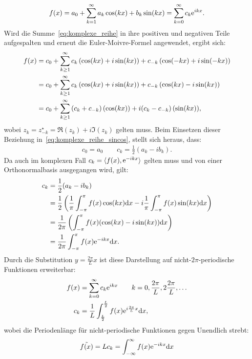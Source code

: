 \begin{align}
\label{eq:komplexe_reihe}
    f(x) = a_0 + \sum_{k=1}^{\infty}{a_k \cos(kx)+b_k \sin(kx)}=\sum_{k=0}^{\infty}{c_k \text{e}^{ikx}}.
\end{align}
Wird die Summe~\eqref{eq:komplexe_reihe} in ihre positiven und negativen Teile aufgespalten und erneut die Euler-Moivre-Formel angewendet, ergibt sich:
\begin{align}
\label{eq:komplexe_reihe_sincos}
    f(x) &= c_0 + \sum_{k\geq 1}^{\infty}{c_k \left( \cos(kx) + i \sin(kx)\right) + c_{-k} \left( \cos(-kx) + i \sin(-kx)\right)} \notag \\
    &= c_0 + \sum_{k\geq 1}^{\infty}{c_k \left( \cos(kx) + i \sin(kx)\right) + c_{-k} \left( \cos(kx) - i \sin(kx)\right)} \notag \\
    &= c_0 + \sum_{k\geq 1}^{\infty}{(c_k + c_{-k}) \left( \cos(kx)\right) + i(c_k - c_{-k})\left( \sin(kx)\right)},
\end{align}
wobei $z_{k}=z_{-k}^\star=\Re(z_k)+i\Im(z_k)$ gelten muss. Beim Einsetzen dieser Beziehung in~\eqref{eq:komplexe_reihe_sincos}, stellt sich heraus, dass:
\begin{align*}
    c_0 = a_0 \qquad c_k = \frac{1}{2}(a_k-ib_k).
\end{align*}
Da auch im komplexen Fall $c_k = \braket{f(x),\text{e}^{-ikx}}$ gelten muss und von einer Orthonormalbasis ausgegangen wird, gilt:
\begin{align}
    c_k &= \frac{1}{2}(a_k - i b_k) \notag \\
    &= \frac{1}{2}\left(\frac{1}{\pi}\int_{-\pi}^{\pi}{f(x)\cos(kx)\text{d} x} - i\frac{1}{\pi}\int_{-\pi}^{\pi}{f(x)\sin(kx)\text{d} x}\right) \notag \\
    &= \frac{1}{2\pi}\left(\int_{-\pi}^{\pi}{f(x)(\cos(kx) - i\sin(kx))\text{d} x}\right) \notag \\
    &= \frac{1}{2\pi}\int_{-\pi}^{\pi}{f(x)\text{e}^{-ikx}\text{d} x}. \\
\end{align}
Durch die Substitution $y=\frac{2\pi}{L}x$ ist diese Darstellung auf nicht-$2\pi$-periodische Funktionen erweiterbar:
\begin{align*}
    f(x) &= \sum_{k=0}^{\infty}{c_k \text{e}^{ikx}} \qquad k=0,\frac{2\pi}{L},2\frac{2\pi}{L},\ldots \\
    c_k &= \frac{1}{L}\int_{\frac{L}{2}}^{\frac{L}{2}}{f(x)\text{e}^{i\frac{2\pi}{L}x}\text{d} x},
\end{align*}
wobei die Periodenlänge für nicht-periodische Funktionen gegen Unendlich strebt:
\begin{align*}
    \tilde{f(x)} = L c_k = \int_{-\infty}^{\infty}{f(x)\text{e}^{-ikx} \text{d} x}
\end{align*}
